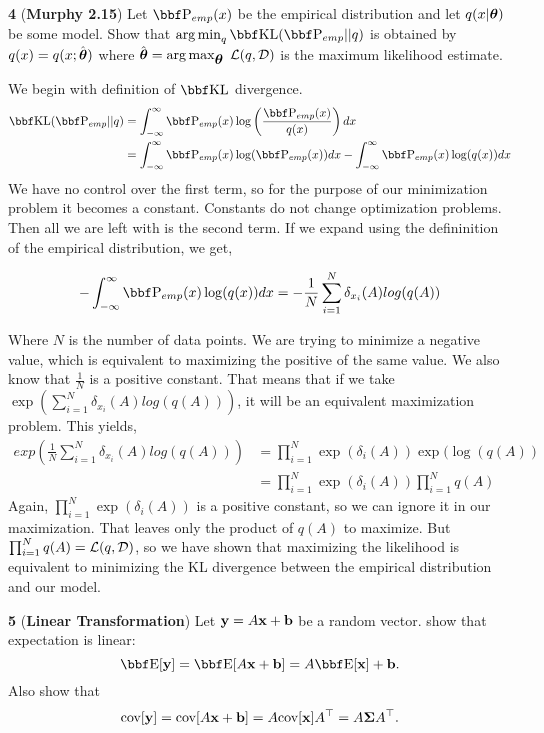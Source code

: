 \documentclass[12pt,letterpaper,fleqn]{hmcpset}
\begin{document}
\newpage




\textbf{4} (\textbf{Murphy 2.15}) Let $\PP_{emp}(x)$ be the empirical distribution and let
$q(x|\hbox{\boldmath$\theta$})$ be some model. Show that $\argmin_q \KL(\PP_{emp} || q)$ is obtained by
$q(x) = q(x ; \hat{\hbox{\boldmath$\theta$}})$ where $\hat{\hbox{\boldmath$\theta$}} = \operatorname*{arg\,max}_{\hbox{\boldmath$\theta$}} \;{\cal L}(q, {\cal D})$ is
the maximum likelihood estimate.

\vspace{15mm}
We begin with definition of $\KL$ divergence.
\begin{align*}
    \KL(\PP_{emp} || q) &= \int_{-\infty}^{\infty}\PP_{emp}(x)\log \left(\frac{\PP_{emp}(x)}{q(x)} \right)dx\\
    &= \int_{-\infty}^{\infty}\PP_{emp}(x)\log(\PP_{emp}(x))dx - \int_{-\infty}^{\infty}\PP_{emp}(x)\log(q(x))dx\\
\end{align*}
We have no control over the first term, so for the purpose of our minimization problem it becomes a constant. Constants do not change optimization problems. Then all we are left with is the second term. If we expand using the defininition of the empirical distribution, we get,

    $$- \int_{-\infty}^{\infty}\PP_{emp}(x)\log(q(x))dx = -\frac{1}{N}\sum_{i=1}^{N}\delta_{x_i}(A)log(q(A))$$

Where $N$ is the number of data points. We are trying to minimize a negative value, which is equivalent to maximizing the positive of the same value. We also know that $\frac{1}{N}$ is a positive constant. That means that if we take $\exp(\sum_{i=1}^{N}\delta_{x_i}(A)log(q(A)))$, it will be an equivalent maximization problem. This yields,
\begin{align*}
    exp(\frac{1}{N}\sum_{i=1}^{N}\delta_{x_i}(A)log(q(A))) &= \prod_{i=1}^N \exp(\delta_i(A))\exp(\log(q(A))\\
    &= \prod_{i=1}^N \exp(\delta_i(A)) \prod_{i=1}^N q(A)
\end{align*}
Again, $\prod_{i=1}^N \exp(\delta_i(A))$ is a positive constant, so we can ignore it in our maximization. That leaves only the product of $q(A)$ to maximize. But $\prod_{i=1}^N q(A) = {\cal L}(q,{\cal D})$, so we have shown that maximizing the likelihood is equivalent to minimizing the KL divergence between the empirical distribution and our model.

\newpage

\textbf{5} (\textbf{Linear Transformation}) Let ${\bf y} = A{\bf x} + {\bf b}$ be a random vector.
show that expectation is linear:
\[
    \EE[\yy] = \EE[A\xx + \bb] = A\EE[\xx] + \bb.
\]
Also show that
\[
    {\hbox{cov}}[{\bf y}] = {\hbox{cov}}[A{\bf x} + {\bf b}] = A {\hbox{cov}}[{\bf x}] A^\top = A\hbox{\boldmath$\Sigma$} A^\top.
\]
\end{document}
